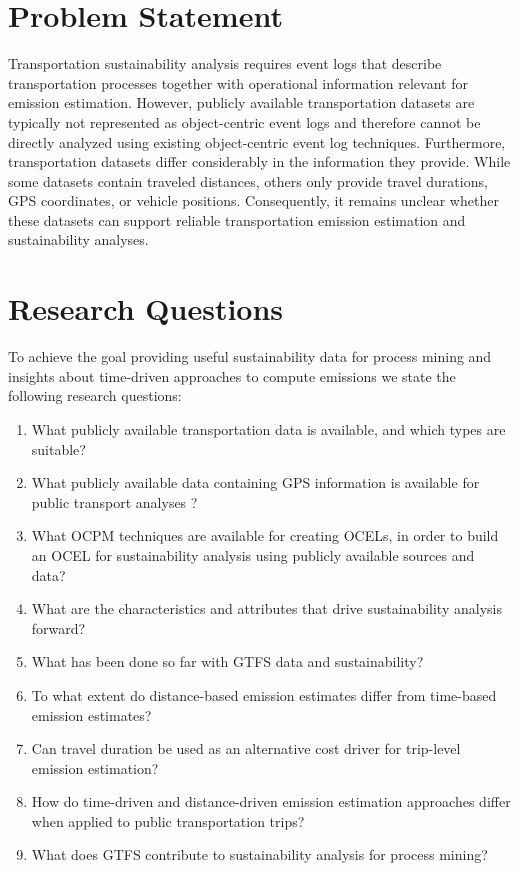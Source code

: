 \section{Problem Statement}
\label{sec:intro_ssec:probs}
Transportation sustainability analysis requires event logs that describe transportation processes together with operational information relevant for emission estimation. However, publicly available transportation datasets are typically not represented as object-centric event logs and therefore cannot be directly analyzed using existing object-centric event log techniques. Furthermore, transportation datasets differ considerably in the information they provide. While some datasets contain traveled distances, others only provide travel durations, GPS coordinates, or vehicle positions. Consequently, it remains unclear whether these datasets can support reliable transportation emission estimation and sustainability analyses.
\section{Research Questions}

To achieve the goal providing useful sustainability data for process mining and insights about time-driven approaches to compute emissions we state the following research questions:



\begin{enumerate}
	\item What publicly available transportation data is available, and which types are suitable?
    \item What publicly available data containing GPS information is available for public transport analyses ?
	\item What OCPM techniques are available for creating OCELs, in order to build an OCEL for sustainability analysis using publicly available sources and data?
	\item What are the characteristics and attributes that drive sustainability analysis forward?
	\item What has been done so far with GTFS data and sustainability?
    \item To what extent do distance-based emission estimates differ from time-based emission estimates?
    \item Can travel duration be used as an alternative cost driver for trip-level emission estimation?
    \item How do time-driven and distance-driven emission estimation approaches differ when applied to public transportation trips?
    \item What does GTFS contribute to sustainability analysis for process mining?

\end{enumerate}


